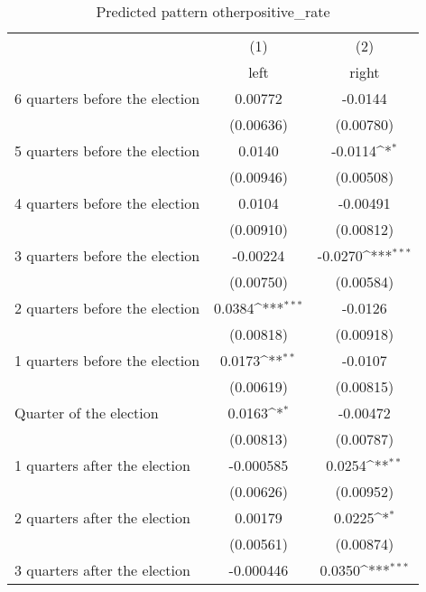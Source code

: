 \begin{table}[htbp]\centering
\def\sym#1{\ifmmode^{#1}\else\(^{#1}\)\fi}
\caption{Predicted pattern otherpositive\_rate}
\begin{tabular}{l*{2}{c}}
\hline\hline
                    &\multicolumn{1}{c}{(1)}&\multicolumn{1}{c}{(2)}\\
                    &\multicolumn{1}{c}{left}&\multicolumn{1}{c}{right}\\
\hline
 6 quarters before the election&     0.00772         &     -0.0144         \\
                    &   (0.00636)         &   (0.00780)         \\
[1em]
 5 quarters before the election&      0.0140         &     -0.0114\sym{*}  \\
                    &   (0.00946)         &   (0.00508)         \\
[1em]
 4 quarters before the election&      0.0104         &    -0.00491         \\
                    &   (0.00910)         &   (0.00812)         \\
[1em]
 3 quarters before the election&    -0.00224         &     -0.0270\sym{***}\\
                    &   (0.00750)         &   (0.00584)         \\
[1em]
 2 quarters before the election&      0.0384\sym{***}&     -0.0126         \\
                    &   (0.00818)         &   (0.00918)         \\
[1em]
 1 quarters before the election&      0.0173\sym{**} &     -0.0107         \\
                    &   (0.00619)         &   (0.00815)         \\
[1em]
Quarter of the election&      0.0163\sym{*}  &    -0.00472         \\
                    &   (0.00813)         &   (0.00787)         \\
[1em]
 1 quarters after the election&   -0.000585         &      0.0254\sym{**} \\
                    &   (0.00626)         &   (0.00952)         \\
[1em]
 2 quarters after the election&     0.00179         &      0.0225\sym{*}  \\
                    &   (0.00561)         &   (0.00874)         \\
[1em]
 3 quarters after the election&   -0.000446         &      0.0350\sym{***}\\

\end{tabular}
\end{table}
